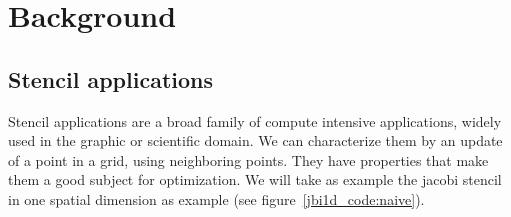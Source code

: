 \documentclass[a4paper,11pt]{article}
\begin{document}
\section{Background}
\subsection{Stencil applications}
Stencil applications are a broad family of compute intensive applications, widely used in
the graphic or scientific domain. We can characterize them by an update of a point in a
grid, using neighboring points. They have properties that make them a good subject for
optimization. We will take as example the jacobi stencil in one spatial dimension as example 
(see figure~\ref{jbi1d_code:naive}).
\end{document}

